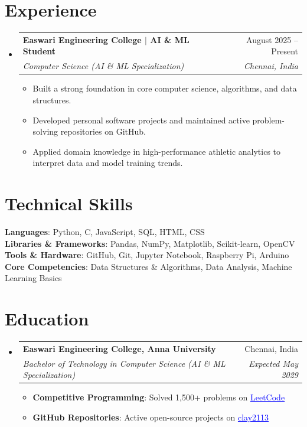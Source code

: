 \documentclass[letterpaper,11pt]{article}
\makeatletter
\newcommand{\resumeItem}[1]{
  \item\small{
    {#1 \vspace{-2pt}}
  }
}
\newcommand{\resumeSubheading}[4]{
  \vspace{-2pt}\item
    \begin{tabular*}{0.97\textwidth}[t]{l@{\extracolsep{\fill}}r}
      \textbf{#1} & #2 \\
      \textit{\small#3} & \textit{\small #4} \\
    \end{tabular*}\vspace{-7pt}
}
\newcommand{\resumeSubHeadingListStart}{\begin{itemize}[leftmargin=0.15in, label={}]}
\newcommand{\resumeSubHeadingListEnd}{\end{itemize}}
\newcommand{\resumeItemListStart}{\begin{itemize}}
\newcommand{\resumeItemListEnd}{\end{itemize}\vspace{-5pt}}
\makeatother
\begin{document}
\section{Experience}
  \resumeSubHeadingListStart

    \resumeSubheading
      {Easwari Engineering College $|$ AI \& ML Student}{August 2025 – Present}
      {\emph{Computer Science (AI \& ML Specialization)}}{Chennai, India}
      \resumeItemListStart
        \resumeItem{Built a strong foundation in core computer science, algorithms, and data structures.}
        \resumeItem{Developed personal software projects and maintained active problem-solving repositories on GitHub.}
        \resumeItem{Applied domain knowledge in high-performance athletic analytics to interpret data and model training trends.}
      \resumeItemListEnd

  \resumeSubHeadingListEnd

\section{Technical Skills}
 \begin{itemize}[leftmargin=0.15in, label={}]
    \small{\item{
     \textbf{Languages}{: Python, C, JavaScript, SQL, HTML, CSS} \\
     \textbf{Libraries \& Frameworks}{: Pandas, NumPy, Matplotlib, Scikit-learn, OpenCV} \\
     \textbf{Tools \& Hardware}{: GitHub, Git, Jupyter Notebook, Raspberry Pi, Arduino} \\
     \textbf{Core Competencies}{: Data Structures \& Algorithms, Data Analysis, Machine Learning Basics} \\
    }}
 \end{itemize}

\section{Education}
  \resumeSubHeadingListStart
    \resumeSubheading
      {Easwari Engineering College, Anna University}{Chennai, India}
      {Bachelor of Technology in Computer Science (AI \& ML Specialization)}{Expected May 2029}
          \resumeItemListStart
            \resumeItem{\textbf{Competitive Programming}: Solved 1,500+ problems on \href{https://leetcode.com/u/nittins}{\textcolor{blue}{\underline{LeetCode}}}}
            \resumeItem{\textbf{GitHub Repositories}: Active open-source projects on \href{https://github.com/clay2113}{\textcolor{blue}{\underline{clay2113}}}}
          \resumeItemListEnd

  \resumeSubHeadingListEnd

\end{document}
